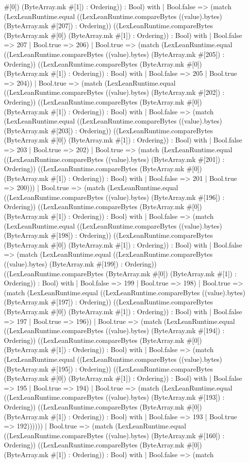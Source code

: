 \documentclass[11pt]{article}
\begin{document}
\#[0]) (ByteArray.mk \#[1]) : Ordering)) : Bool) with | Bool.false => (match (LexLeanRuntime.equal ((LexLeanRuntime.compareBytes ((value).bytes) (ByteArray.mk \#[207]) : Ordering)) ((LexLeanRuntime.compareBytes (ByteArray.mk \#[0]) (ByteArray.mk \#[1]) : Ordering)) : Bool) with | Bool.false => 207 | Bool.true => 206) | Bool.true => (match (LexLeanRuntime.equal ((LexLeanRuntime.compareBytes ((value).bytes) (ByteArray.mk \#[205]) : Ordering)) ((LexLeanRuntime.compareBytes (ByteArray.mk \#[0]) (ByteArray.mk \#[1]) : Ordering)) : Bool) with | Bool.false => 205 | Bool.true => 204)) | Bool.true => (match (LexLeanRuntime.equal ((LexLeanRuntime.compareBytes ((value).bytes) (ByteArray.mk \#[202]) : Ordering)) ((LexLeanRuntime.compareBytes (ByteArray.mk \#[0]) (ByteArray.mk \#[1]) : Ordering)) : Bool) with | Bool.false => (match (LexLeanRuntime.equal ((LexLeanRuntime.compareBytes ((value).bytes) (ByteArray.mk \#[203]) : Ordering)) ((LexLeanRuntime.compareBytes (ByteArray.mk \#[0]) (ByteArray.mk \#[1]) : Ordering)) : Bool) with | Bool.false => 203 | Bool.true => 202) | Bool.true => (match (LexLeanRuntime.equal ((LexLeanRuntime.compareBytes ((value).bytes) (ByteArray.mk \#[201]) : Ordering)) ((LexLeanRuntime.compareBytes (ByteArray.mk \#[0]) (ByteArray.mk \#[1]) : Ordering)) : Bool) with | Bool.false => 201 | Bool.true => 200))) | Bool.true => (match (LexLeanRuntime.equal ((LexLeanRuntime.compareBytes ((value).bytes) (ByteArray.mk \#[196]) : Ordering)) ((LexLeanRuntime.compareBytes (ByteArray.mk \#[0]) (ByteArray.mk \#[1]) : Ordering)) : Bool) with | Bool.false => (match (LexLeanRuntime.equal ((LexLeanRuntime.compareBytes ((value).bytes) (ByteArray.mk \#[198]) : Ordering)) ((LexLeanRuntime.compareBytes (ByteArray.mk \#[0]) (ByteArray.mk \#[1]) : Ordering)) : Bool) with | Bool.false => (match (LexLeanRuntime.equal ((LexLeanRuntime.compareBytes ((value).bytes) (ByteArray.mk \#[199]) : Ordering)) ((LexLeanRuntime.compareBytes (ByteArray.mk \#[0]) (ByteArray.mk \#[1]) : Ordering)) : Bool) with | Bool.false => 199 | Bool.true => 198) | Bool.true => (match (LexLeanRuntime.equal ((LexLeanRuntime.compareBytes ((value).bytes) (ByteArray.mk \#[197]) : Ordering)) ((LexLeanRuntime.compareBytes (ByteArray.mk \#[0]) (ByteArray.mk \#[1]) : Ordering)) : Bool) with | Bool.false => 197 | Bool.true => 196)) | Bool.true => (match (LexLeanRuntime.equal ((LexLeanRuntime.compareBytes ((value).bytes) (ByteArray.mk \#[194]) : Ordering)) ((LexLeanRuntime.compareBytes (ByteArray.mk \#[0]) (ByteArray.mk \#[1]) : Ordering)) : Bool) with | Bool.false => (match (LexLeanRuntime.equal ((LexLeanRuntime.compareBytes ((value).bytes) (ByteArray.mk \#[195]) : Ordering)) ((LexLeanRuntime.compareBytes (ByteArray.mk \#[0]) (ByteArray.mk \#[1]) : Ordering)) : Bool) with | Bool.false => 195 | Bool.true => 194) | Bool.true => (match (LexLeanRuntime.equal ((LexLeanRuntime.compareBytes ((value).bytes) (ByteArray.mk \#[193]) : Ordering)) ((LexLeanRuntime.compareBytes (ByteArray.mk \#[0]) (ByteArray.mk \#[1]) : Ordering)) : Bool) with | Bool.false => 193 | Bool.true => 192)))))) | Bool.true => (match (LexLeanRuntime.equal ((LexLeanRuntime.compareBytes ((value).bytes) (ByteArray.mk \#[160]) : Ordering)) ((LexLeanRuntime.compareBytes (ByteArray.mk \#[0]) (ByteArray.mk \#[1]) : Ordering)) : Bool) with | Bool.false => (match 
\end{document}
